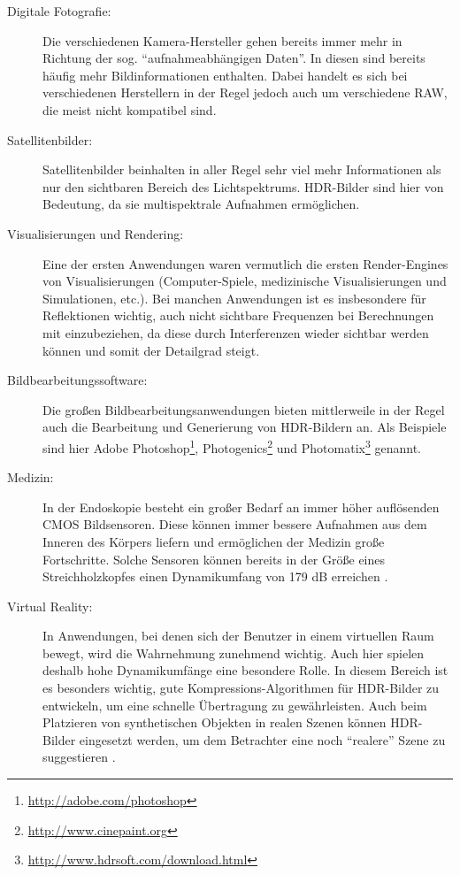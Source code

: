 \begin{description}

\item[Digitale Fotografie:] Die verschiedenen Kamera-Hersteller gehen bereits immer mehr in Richtung der sog.  \enquote{aufnahmeabhängigen Daten}. In diesen sind bereits häufig mehr Bildinformationen enthalten. Dabei handelt es sich bei verschiedenen Herstellern in der Regel jedoch auch um verschiedene \acrfull{RAW}, die meist nicht kompatibel sind. 

\item[Satellitenbilder:] Satellitenbilder beinhalten in aller Regel sehr viel mehr Informationen als nur den sichtbaren Bereich des Lichtspektrums. \gls{HDR}-Bilder sind hier von Bedeutung, da sie multispektrale Aufnahmen ermöglichen.

\item[Visualisierungen und Rendering:] Eine der ersten Anwendungen waren vermutlich die ersten Render-Engines von Visualisierungen (Computer-Spiele, medizinische Visualisierungen und Simulationen, etc.). Bei manchen Anwendungen ist es insbesondere für Reflektionen wichtig, auch nicht sichtbare Frequenzen bei Berechnungen mit einzubeziehen, da diese durch Interferenzen wieder sichtbar werden können und somit der Detailgrad steigt.

\item[Bildbearbeitungssoftware:] Die großen Bildbearbeitungsanwendungen bieten mittlerweile in der Regel auch die Bearbeitung und Generierung von \gls{HDR}-Bildern an. Als Beispiele sind hier Adobe Photoshop\footnote{\url{http://adobe.com/photoshop}}, Photogenics\footnote{\url{http://www.cinepaint.org}} und Photomatix\footnote{\url{http://www.hdrsoft.com/download.html}} genannt.

\item[Medizin:] In der Endoskopie besteht ein großer Bedarf an immer höher auflösenden \gls{CMOS} Bildsensoren. Diese können immer bessere Aufnahmen aus dem Inneren des Körpers liefern und ermöglichen der Medizin große Fortschritte. Solche Sensoren können bereits in der Größe eines Streichholzkopfes einen Dynamikumfang von 179 dB erreichen \cite{Klingler_Richter_Strobel_2006}.

\item[Virtual Reality:] In Anwendungen, bei denen sich der Benutzer in einem virtuellen Raum bewegt, wird die Wahrnehmung zunehmend wichtig. Auch hier spielen deshalb hohe Dynamikumfänge eine besondere Rolle. In diesem Bereich ist es besonders wichtig, gute Kompressions-Algorithmen für \gls{HDR}-Bilder zu entwickeln, um eine schnelle Übertragung zu gewährleisten. Auch beim Platzieren von synthetischen Objekten in realen Szenen können \gls{HDR}-Bilder eingesetzt werden, um dem Betrachter eine noch \enquote{realere} Szene zu suggestieren \cite{Debevec:2008:RSO:1401132.1401175}.
\end{description}

